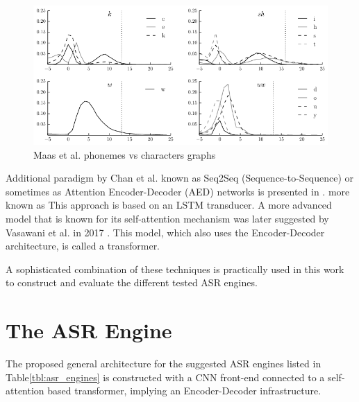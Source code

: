 \begin{figure}[H]
    \centering
    \includegraphics[width=0.95\linewidth]{ASR/images/CTC_maas_graph}
    \caption{Maas et al. \cite{maas-etal-2015-lexicon} phonemes vs characters graphs}\label{fig:CTC_maas_graph}
\end{figure}

Additional paradigm by Chan et al. known as Seq2Seq (Sequence-to-Sequence) or sometimes as Attention Encoder-Decoder (AED) networks
is presented in \cite{44926}.
 more known as
This approach is based on an LSTM transducer.
A more advanced model that is known for its self-attention mechanism 
was later suggested by Vasawani et al. in 2017 \cite{vaswani2017attention}.
This model, which also uses the Encoder-Decoder architecture, is called a transformer.

A sophisticated combination of these techniques is practically used in this work to construct and evaluate the different tested ASR engines.



\section{The ASR Engine}
The proposed general architecture for the suggested 
ASR engines listed in Table\;\ref{tbl:asr_engines} 
is constructed with a CNN front-end connected to
a self-attention based transformer, 
implying an Encoder-Decoder infrastructure. 

